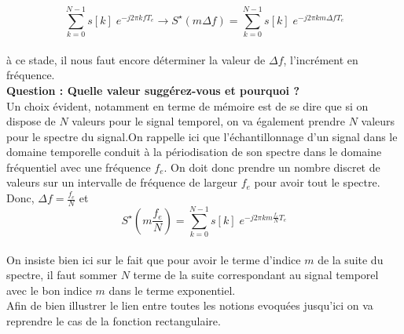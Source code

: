 \documentclass[11pt,a4paper]{article}
\begin{document}
\[\sum_{k = 0}^{N-1} s[k] \; e^{-j 2 \pi k f T_e} \rightarrow S^{\star} (m \Delta f) = \sum_{k = 0}^{N-1} s[k] \; e^{-j 2 \pi k m \Delta f T_e} \]\\

à ce stade, il nous faut encore déterminer la valeur de $\Delta f$, l'incrément en fréquence.\\

\textbf{Question : Quelle valeur suggérez-vous et pourquoi ?}\\

Un choix évident, notamment en terme de mémoire est de se dire que si on dispose de $N$ valeurs pour le signal temporel, on va également prendre $N$ valeurs pour le spectre du signal.On rappelle ici que l'échantillonnage d'un signal dans le domaine temporelle conduit à la périodisation de son spectre dans le domaine fréquentiel avec une fréquence $f_e$. On doit donc prendre un nombre discret de valeurs sur un intervalle de fréquence de largeur $f_e$ pour avoir tout le spectre. Donc, $\Delta f = \frac{f_e}{N}$ et\\

\[S^{\star} (m \frac{f_e}{N}) = \sum_{k = 0}^{N-1} s[k] \; e^{-j 2 \pi k m \frac{f_e}{N} T_e} \]\\

On insiste bien ici sur le fait que pour avoir le terme d'indice $m$ de la suite du spectre, il faut sommer $N$ terme de la suite correspondant au signal temporel avec le bon indice $m$ dans le terme exponentiel.\\

Afin de bien illustrer le lien entre toutes les notions evoquées jusqu'ici on va reprendre le cas de la fonction rectangulaire.

\begin{center}
\end{center}
\end{document}
